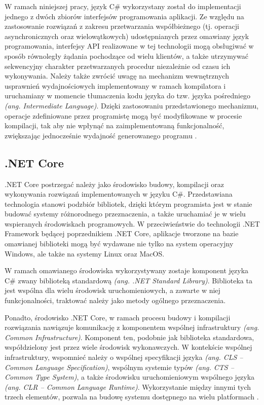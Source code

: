 W ramach niniejszej pracy, język C\# wykorzystany został do implementacji jednego z dwóch zbiorów interfejsów programowania aplikacji. Ze względu na zastosowanie rozwiązań z zakresu przetwarzania współbieżnego (tj. operacji asynchronicznych oraz wielowątkowych) udostępnianych przez omawiany język programowania, interfejsy API realizowane w tej technologii mogą obsługiwać w sposób równoległy żądania pochodzące od wielu klientów, a także utrzymywać sekwencyjny charakter przetwarzanych procedur niezależnie od czasu ich wykonywania. Należy także zwrócić uwagę na mechanizm wewnętrznych usprawnień wydajnościowych implementowany w ramach kompilatora i uruchamiany w momencie tłumaczenia kodu języka do tzw. języka pośredniego \textit{(ang. Intermediate Language)}. Dzięki zastosowaniu przedstawionego mechanizmu, operacje zdefiniowane przez programistę mogą być modyfikowane w procesie kompilacji, tak aby nie wpłynąć na zaimplementowaną funkcjonalność, zwiększając jednocześnie wydajność generowanego programu \cite{hejlsberg2003c}.
\subsection*{.NET Core}
.NET Core postrzegać należy jako środowisko budowy, kompilacji oraz wykonywania rozwiązań implementowanych w języku C\#. Przedstawiana technologia stanowi podzbiór bibliotek, dzięki którym programista jest w stanie budować systemy różnorodnego przeznaczenia, a także uruchamiać je w wielu wspieranych środowiskach programowych. W przeciwieństwie do technologii .NET Framework będącej poprzednikiem .NET Core, aplikacje tworzone na bazie omawianej biblioteki mogą być wydawane nie tylko na system operacyjny Windows, ale także na systemy Linux oraz MacOS.

W ramach omawianego środowiska wykorzystywany zostaje komponent języka C\# zwany biblioteką standardową \textit{(ang. .NET Standard Library)}. Biblioteka ta jest wspólna dla wielu środowisk uruchomieniowych, a zawarte w niej funkcjonalności, traktować należy jako metody ogólnego przeznaczenia.

Ponadto, środowisko .NET Core, w ramach procesu budowy i kompilacji rozwiązania nawiązuje komunikację z komponentem wspólnej infrastruktury \textit{(ang. Common Infrastructure)}. Komponent ten, podobnie jak biblioteka standardowa, współdzielony jest przez wiele środowisk wykonawczych. W kontekście wspólnej infrastruktury, wspomnieć należy o wspólnej specyfikacji języka \textit{(ang. CLS -- Common Language Specification)}, wspólnym systemie typów \textit{(ang. CTS -- Common Type System)}, a także środowisku uruchomieniowym wspólnego języka \textit{(ang. CLR -- Common Language Runtime)}. Wykorzystanie między innymi tych trzech elementów, pozwala na budowę systemu dostępnego na wielu platformach \cite{troelsen2017pro}.

